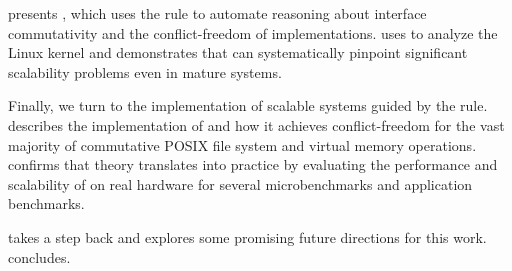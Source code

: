  presents \tool, which uses the rule to automate
reasoning about interface commutativity and the conflict-freedom of
implementations.   uses \tool to analyze the Linux
kernel and demonstrates that \tool can systematically pinpoint
significant scalability problems even in mature systems.

Finally, we turn to the implementation of scalable systems guided by
the rule.   describes the implementation of \sys and how
it achieves conflict-freedom for the vast majority of commutative
POSIX file system and virtual memory operations.  
confirms that theory translates into practice by evaluating the
performance and scalability of \sys on real hardware for several
microbenchmarks and application benchmarks.

 takes a step back and explores some promising
future directions for this work.   concludes.


